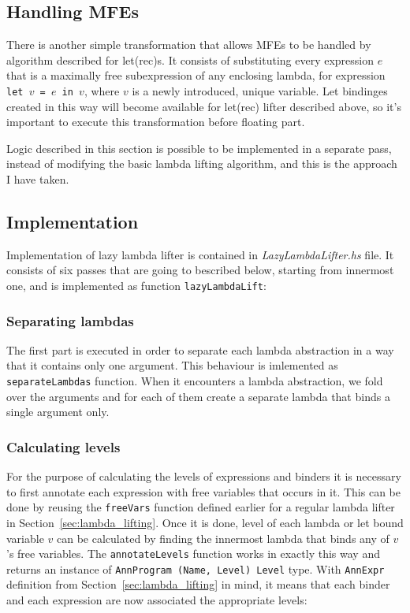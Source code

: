 \documentclass[12pt,a4paper]{report}
\begin{document}
\subsection{Handling MFEs}
There is another simple transformation that allows MFEs to be handled by
algorithm described for let(rec)s. It consists of substituting every expression
$e$ that is a maximally free subexpression of any enclosing lambda, for
expression \texttt{let $v$ = $e$ in $v$}, where $v$ is a newly introduced,
unique variable. Let bindinges created in this way will become available for
let(rec) lifter described above, so it's important to execute this
transformation before floating part.

Logic described in this section is possible to be implemented in a separate
pass, instead of modifying the basic lambda lifting algorithm, and this is the
approach I have taken.

\subsection{Implementation}
Implementation of lazy lambda lifter is contained in
\textit{LazyLambdaLifter.hs} file. It consists of six passes that are going to
bescribed below, starting from innermost one, and is implemented as function
\texttt{lazyLambdaLift}:

\vspace*{0.2in}

\subsubsection{Separating lambdas}
The first part is executed in order to separate each lambda abstraction in a
way that it contains only one argument. This behaviour is imlemented as
\texttt{separateLambdas} function. When it encounters a lambda abstraction, we
fold over the arguments and for each of them create a separate lambda that
binds a single argument only.

\subsubsection{Calculating levels}
For the purpose of calculating the levels of expressions and binders it is
necessary to first annotate each expression with free variables that occurs in
it. This can be done by reusing the \texttt{freeVars} function defined earlier
for a regular lambda lifter in Section~\ref{sec:lambda_lifting}. Once it is
done, level of each lambda or let bound variable $v$ can be calculated by
finding the innermost lambda that binds any of $v$'s free variables. The
\texttt{annotateLevels} function works in exactly this way and returns an
instance of \texttt{AnnProgram (Name, Level) Level} type. With \texttt{AnnExpr}
definition from Section~\ref{sec:lambda_lifting} in mind, it means that each
binder and each expression are now associated the appropriate levels:
\end{document}
